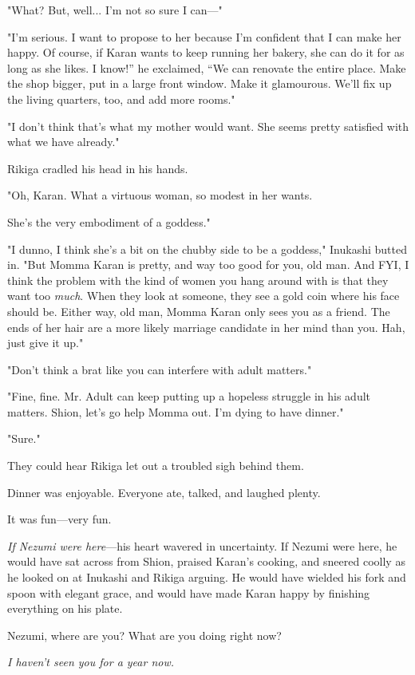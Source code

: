 "What? But, well... I'm not so sure I can---"

"I'm serious. I want to propose to her because I'm confident that I can
make her happy. Of course, if Karan wants to keep running her bakery,
she can do it for as long as she likes. I know!'' he exclaimed, ``We can
renovate the entire place. Make the shop bigger, put in a large front
window. Make it glamourous. We'll fix up the living quarters, too, and
add more rooms."

"I don't think that's what my mother would want. She seems pretty
satisfied with what we have already."

Rikiga cradled his head in his hands.

"Oh, Karan. What a virtuous woman, so modest in her wants.~

She's the very embodiment of a goddess."

"I dunno, I think she's a bit on the chubby side to be a goddess,"
Inukashi butted in. "But Momma Karan is pretty, and way too good for
you, old man. And FYI, I think the problem with the kind of women you
hang around with is that they want too \emph{much}. When they look at someone,
they see a gold coin where his face should be. Either way, old man,
Momma Karan only sees you as a friend. The ends of her hair are a more
likely marriage candidate in her mind than you. Hah, just give it up."

"Don't think a brat like you can interfere with adult matters."

"Fine, fine. Mr. Adult can keep putting up a hopeless struggle in his
adult matters. Shion, let's go help Momma out. I'm dying to have
dinner."

"Sure."

They could hear Rikiga let out a troubled sigh behind them.

Dinner was enjoyable. Everyone ate, talked, and laughed plenty.

It was fun---very fun.

\emph{If Nezumi were here}---his heart wavered in uncertainty. If Nezumi were
here, he would have sat across from Shion, praised Karan's cooking, and
sneered coolly as he looked on at Inukashi and Rikiga arguing. He would
have wielded his fork and spoon with elegant grace, and would have made
Karan happy by finishing everything on his plate.

Nezumi, where are you? What are you doing right now?

\emph{I haven't seen you for a year now.}

